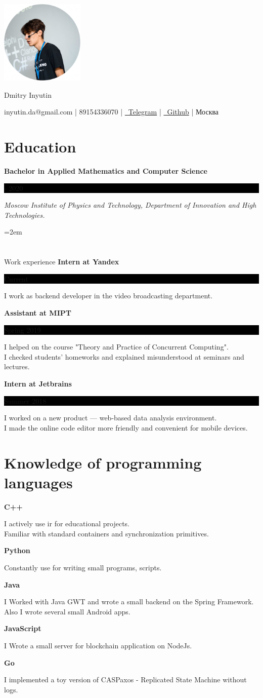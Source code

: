 \documentclass[fontsize=11pt]{article}
\newcommand{\MyName}[1]{ %
    \Huge \centering #1
    \par \normalsize \normalfont}
\newcommand{\NewPart}[1]{\section*{#1}}
\newcommand{\ProgrammingEntry}[2]{
    \noindent \textbf{#1} \hfill      %

    \noindent \small #2 %
    \normalsize \par}
\newcommand{\EducationEntry}[4]{
    \noindent \textbf{#1} \hfill      %
    \colorbox{Black}{
      \parbox{10em}{
      \color{White} \centering #2}} \par   %
    \noindent \textit{#3} \par        %
    \noindent\hangindent=2em\hangafter=0 \small #4 %
    \normalsize \par}
\newcommand{\WorkEntry}[3]{       %
    \noindent \large \textbf{#1} \hfill      %
    \colorbox{Black}{%
      \parbox{10em}{%
      \color{White} \centering #2}} \par  %
    \noindent \small #3 %
    \normalsize \par}
\begin{document}
\begin{minipage}{0.2\textwidth}%
\includegraphics[width=4cm]{me.png}
\end{minipage}%
\hfill%
\begin{minipage}{14cm}\raggedright
\bigskip
\bigskip
\bigskip
\bigskip
\bigskip
\bigskip
\MyName{Dmitry Inyutin}
\bigskip
{inyutin.da@gmail.com | 89154336070 | \href{https://t.me/inyutin}{\faTelegram \, Telegram} | \href{https://github.com/inyutin}{\faGithub \, Github} | Москва}
\end{minipage}



\NewPart{Education}{}
\EducationEntry
{Bachelor in Applied Mathematics and Computer Science}
{2016 - 2020}
{Moscow Institute of Physics and Technology, Department of Innovation and High Technologies.}

\NewPart{Work experience}{}
\WorkEntry
{Intern at Yandex}
{Current}
{I work as backend developer in the video broadcasting department.}

\bigskip

\WorkEntry
{Assistant at MIPT}
{Spring 2019}
{I helped on the course "Theory and Practice of Concurrent Computing". \\ I checked students' homeworks and explained misunderstood at seminars and lectures.}

\bigskip

\WorkEntry
{Intern at Jetbrains}
{Summer 2018}
{I worked on a new product — web-based data analysis environment. \\ I made the online code editor more friendly and convenient for mobile devices.}

\NewPart{Knowledge of programming languages}{}
\ProgrammingEntry
{C++ \bigstar \bigstar \bigstar}
{I actively use ir for educational projects. \\ Familiar with standard containers and synchronization primitives.}
\bigskip
\ProgrammingEntry
{Python \bigstar \bigstar \bigstar}
{Constantly use for writing small programs, scripts.}
\bigskip
\ProgrammingEntry
{Java \bigstar \bigstar}
{I Worked with Java GWT and wrote a small backend on the Spring Framework. \\
Also I wrote several small Android apps.}
\bigskip
\ProgrammingEntry
{JavaScript \bigstar \bigstar}
{I Wrote a small server for blockchain application on NodeJs.}
\bigskip
\ProgrammingEntry
{Go \bigstar}
{I implemented a toy version of CASPaxos - Replicated State Machine without logs.}
\end{document}
